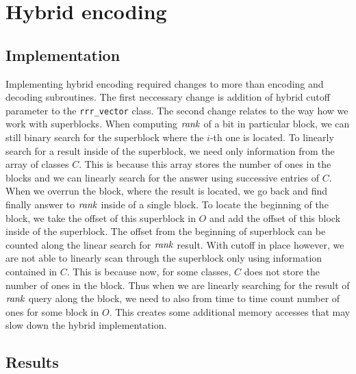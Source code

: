 \section{Hybrid encoding}

\subsection{Implementation}

Implementing hybrid encoding required changes to more than encoding and decoding
subroutines. The first neccessary change is addition of hybrid cutoff parameter
to the \texttt{rrr\_vector} class. The second change relates to the way how we work
with superblocks. When computing $\mathit{rank}$ of a bit in particular block, we can still binary
search for the superblock where the $i$-th one is located. To linearly search for a result
inside of the superblock, we need only information from the array of classes $C$.
This is because this array stores the number of ones in the blocks and we can linearly
search for the answer using successive entries of $C$. When we overrun the block, where
the result is located, we go back and find finally answer to $\mathit{rank}$ inside of a
single block. To locate the beginning of the block, we take the offset of this superblock
in $O$ and add the offset of this block inside of the superblock. The offset from the
beginning of superblock can be counted along the linear search for $\mathit{rank}$ result.
With cutoff in place however, we are not able to linearly scan through the superblock
only using information contained in $C$. This is because now, for some classes, $C$ does
not store the number of ones in the block. Thus when we are linearly searching for the result
of $\mathit{rank}$ query along the block, we need to also from time to time count number of ones
for some block in $O$. This creates some additional memory accesses that may slow down the
hybrid implementation.

\subsection{Results}